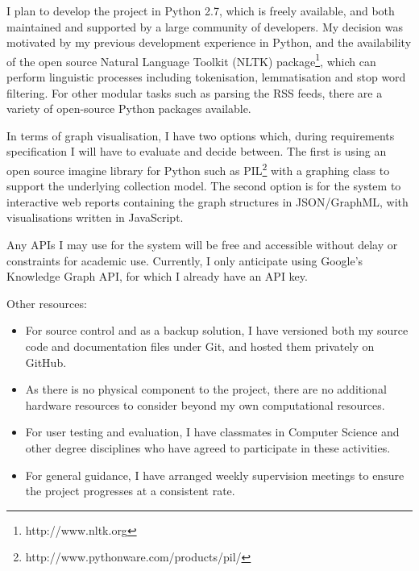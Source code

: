 I plan to develop the project in Python 2.7, which is freely available, and both maintained and supported by a large community of developers. My decision was motivated by my previous development experience in Python, and the availability of the open source Natural Language Toolkit (NLTK) package\footnote{http://www.nltk.org}, which can perform linguistic processes including tokenisation, lemmatisation and stop word filtering. For other modular tasks such as parsing the RSS feeds, there are a variety of open-source Python packages available.

In terms of graph visualisation, I have two options which, during requirements specification I will have to evaluate and decide between. The first is using an open source imagine library for Python such as PIL\footnote{http://www.pythonware.com/products/pil/} with a graphing class to support the underlying collection model. The second option is for the system to interactive web reports containing the graph structures in JSON/GraphML, with visualisations written in JavaScript.

Any APIs I may use for the system will be free and accessible without delay or constraints for academic use. Currently, I only anticipate using Google's Knowledge Graph API, for which I already have an API key.

Other resources:
\begin{itemize}
	\item For source control and as a backup solution, I have versioned both my source code and documentation files under Git, and hosted them privately on GitHub.
	\item As there is no physical component to the project, there are no additional hardware resources to consider beyond my own computational resources.
	\item For user testing and evaluation, I have classmates in Computer Science and other degree disciplines who have agreed to participate in these activities.
	\item For general guidance, I have arranged weekly supervision meetings to ensure the project progresses at a consistent rate.
\end{itemize}